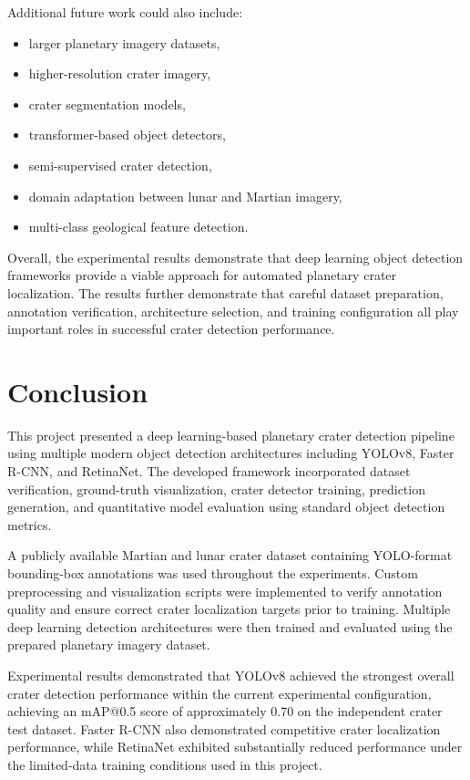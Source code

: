\documentclass[conference]{IEEEtran}
\begin{document}
	Additional future work could also include:
	\begin{itemize}
		\item larger planetary imagery datasets,
		\item higher-resolution crater imagery,
		\item crater segmentation models,
		\item transformer-based object detectors,
		\item semi-supervised crater detection,
		\item domain adaptation between lunar and Martian imagery,
		\item multi-class geological feature detection.
	\end{itemize}
	
	Overall, the experimental results demonstrate that deep learning object detection frameworks provide a viable approach for automated planetary crater localization. The results further demonstrate that careful dataset preparation, annotation verification, architecture selection, and training configuration all play important roles in successful crater detection performance.
	
	\section{Conclusion}
	
	This project presented a deep learning-based planetary crater detection pipeline using multiple modern object detection architectures including YOLOv8, Faster R-CNN, and RetinaNet. The developed framework incorporated dataset verification, ground-truth visualization, crater detector training, prediction generation, and quantitative model evaluation using standard object detection metrics.
	
	A publicly available Martian and lunar crater dataset containing YOLO-format bounding-box annotations was used throughout the experiments. Custom preprocessing and visualization scripts were implemented to verify annotation quality and ensure correct crater localization targets prior to training. Multiple deep learning detection architectures were then trained and evaluated using the prepared planetary imagery dataset.
	
	Experimental results demonstrated that YOLOv8 achieved the strongest overall crater detection performance within the current experimental configuration, achieving an mAP@0.5 score of approximately 0.70 on the independent crater test dataset. Faster R-CNN also demonstrated competitive crater localization performance, while RetinaNet exhibited substantially reduced performance under the limited-data training conditions used in this project.
	
\end{document}
